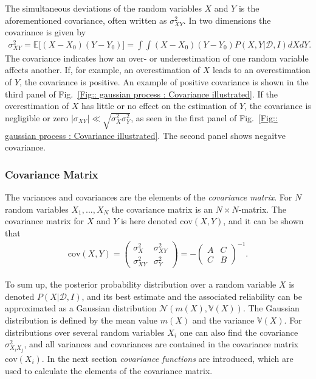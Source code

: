 \documentclass[twoside,english]{uiofysmaster}
\begin{document}
The simultaneous deviations of the random variables $X$ and $Y$ is the aforementioned covariance, often written as $\sigma_{XY}^2$. In two dimensions the covariance is given by
\begin{align}
\sigma_{XY}^2 = \mathbb{E} \big[(X - X_0) (Y - Y_0) \big] =\int \int (X - X_0) (Y - Y_0) P (X, Y | \mathcal{D}, I) dXdY.
\end{align}
The covariance indicates how an over- or underestimation of one random variable affects another. If, for example, an overestimation of $X$ leads to an overestimation of $Y$, the covariance is positive. An example of positive covariance is shown in the third panel of Fig.~\ref{Fig:: gaussian process : Covariance illustrated}. If the overestimation of $X$ has little or no effect on the estimation of $Y$, the covariance is negligible or zero $|\sigma_{XY}| \ll \sqrt{\sigma_X^2 \sigma_Y^2}$, as seen in the first panel of Fig.~\ref{Fig:: gaussian process : Covariance illustrated}. The second panel shows negaitve covariance.

\subsubsection{Covariance Matrix}

The variances and covariances are the elements of the \textit{covariance matrix}. For $N$ random variables $X_1, ...,X_N$ the covariance matrix is an $N \times N$-matrix. The covariance matrix for $X$ and $Y$ is here denoted $\text{cov}(X,Y)$, and it can be shown that \cite{sivia2006data}
\begin{align}
\text{cov}(X,Y) = 
\begin{pmatrix}
\sigma_X^2 & \sigma_{XY}^2\\
\sigma_{XY}^2 & \sigma_Y^2
\end{pmatrix}
= - \begin{pmatrix}
A & C\\
C & B
\end{pmatrix}^{-1}.
\end{align}

To sum up, the posterior probability distribution over a random variable $X$ is denoted $P(X | \mathcal{D}, I)$, and its best estimate and the associated reliability can be approximated as a Gaussian distribution $\mathcal{N}(m(X), \mathbb{V}(X))$. The Gaussian distribution is defined by the mean value $m(X)$ and the variance $\mathbb{V}(X)$. For distributions over several random variables $X_i$ one can also find the covariance $\sigma_{X_i X_j}^2$, and all variances and covariances are contained in the covariance matrix $\text{cov}(X_i)$. In the next section \textit{covariance functions} are introduced, which are used to calculate the elements of the covariance matrix.
\end{document}
